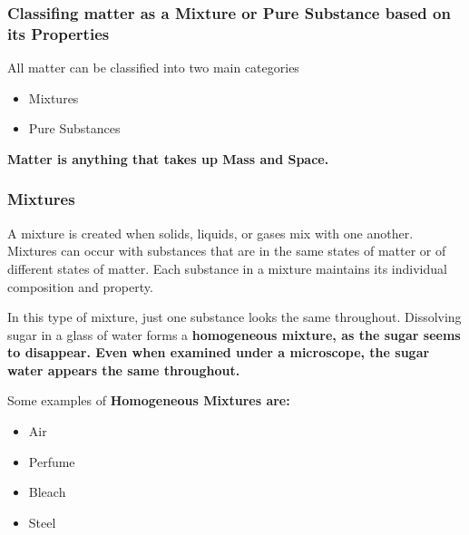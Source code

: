 
\subsubsection*{Classifing matter as a Mixture or Pure Substance based on its Properties}

All matter can be classified into two main categories

\begin{itemize}
    \item Mixtures
    \item Pure Substances
\end{itemize}

\begin{definition}[Matter]
    \bf{Matter} is anything that takes up \bf{Mass} and \bf{Space}.
\end{definition}

\subsubsection*{Mixtures}

A mixture is created when solids, liquids, or gases mix with one another.
Mixtures can occur with substances that are in the same states of matter or of
different states of matter. Each substance in a mixture maintains its
individual composition and property.

\begin{definition}[Homogeneous]
    In this type of mixture, just one substance looks the same throughout.
    Dissolving sugar in a glass of water forms a \bf{homogeneous} mixture,
    as the sugar seems to disappear. Even when examined under a microscope, the
    sugar water appears the same throughout.
    
    Some examples of \bf{Homogeneous Mixtures} are:
    
    \begin{itemize}
        \item Air
        \item Perfume
        \item Bleach
        \item Steel
    \end{itemize}
\end{definition}

